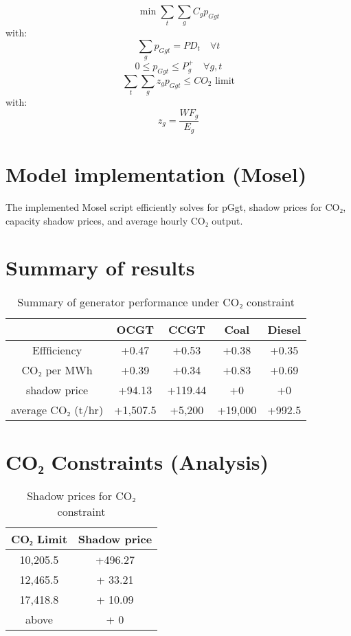 \documentclass{report}
\begin{document}
\[
\min \sum_t \sum_g C_g p_{Ggt}
\]
with:
\[
\sum_g p_{Ggt} = PD_t \quad \forall t
\]
\[
0 \le p_{Ggt} \le P_g^+ \quad \forall g,t
\]
\[
\sum_t \sum_g z_g p_{Ggt} \le CO_2\text{ limit}
\]
with:
\[
z_g = \frac{WF_g}{E_g}
\]

\section{Model implementation (Mosel)}

The implemented Mosel script efficiently solves for pGgt, shadow prices for CO₂, capacity shadow prices, and average hourly CO₂ output.

\section{Summary of results}

\begin{table}[h]
\centering
\begin{tabular}{|c|c|c|c|c|}
\hline
 & OCGT & CCGT & Coal & Diesel \\
\hline
Effficiency & +0.47 & +0.53 & +0.38 & +0.35 \\
CO₂ per MWh & +0.39 & +0.34 & +0.83 & +0.69 \\
shadow price & +94.13 & +119.44 & +0 & +0 \\
average CO₂ (t/hr) & +1,507.5 & +5,200 & +19,000 & +992.5 \\
\hline
\end{tabular}
\caption{Summary of generator performance under CO₂ constraint}
\end{table}

\section{CO₂ Constraints (Analysis)}    

\begin{table}[h]
\centering
\begin{tabular}{|c|c|}
\hline
CO₂ Limit &  Shadow price \\
\hline
10,205.5 & +496.27 \\
12,465.5 & +  33.21 \\
17,418.8 & +  10.09 \\
above & +   0 \\
\hline
\end{tabular}
\caption{Shadow prices for CO₂ constraint}
\end{table}
\end{document}
